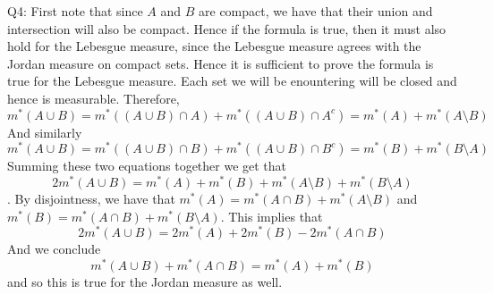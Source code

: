 \documentclass[letterpaper]{article}
\begin{document}
\noindent Q4: First note that since $A$ and $B$ are compact, we have that their union and intersection will also be compact. Hence if the formula is true, then it must also hold for the Lebesgue measure, since the Lebesgue measure agrees with the Jordan measure on compact sets. Hence it is sufficient to prove the formula is true for the Lebesgue measure. Each set we will be enountering will be closed and hence is measurable. Therefore, 
$$m^\ast(A\cup B) = m^\ast((A\cup B)\cap A) + m^\ast ((A\cup B )\cap A^c) = m^\ast(A) + m^\ast(A\setminus B)$$
And similarly $$m^\ast(A\cup B) = m^\ast((A\cup B)\cap B) + m^\ast((A\cup B)\cap B^c) = m^\ast(B) + m^\ast(B\setminus A)$$
Summing these two equations together we get that $$2m^\ast(A\cup B) = m^\ast(A) + m^\ast(B) + m^\ast(A\setminus B) + m^\ast(B \setminus A)$$. 
By disjointness, we have that $m^\ast(A) = m^\ast(A\cap B) + m^\ast(A\setminus B)$ and $m^\ast(B) = m^\ast(A\cap B) + m^\ast(B\setminus A)$. This implies that $$2m^\ast(A\cup B) = 2m^\ast(A) + 2m^\ast(B) - 2m^\ast(A\cap B)$$
And we conclude $$m^\ast(A\cup B) + m^\ast (A \cap B) = m^\ast(A) + m^\ast (B)$$ and so this is true for the Jordan measure as well. 
\end{document}
